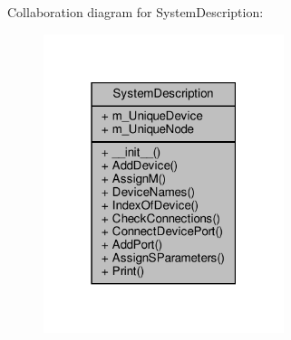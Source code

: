 Collaboration diagram for System\+Description\+:\nopagebreak
\begin{figure}[H]
\begin{center}
\leavevmode
\includegraphics[width=199pt]{classSignalIntegrity_1_1SystemDescriptions_1_1SystemDescription_1_1SystemDescription__coll__graph}
\end{center}
\end{figure}
